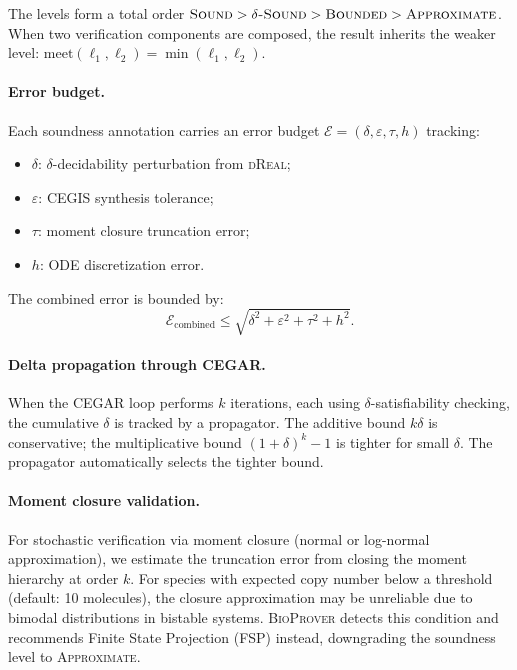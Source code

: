 \documentclass[11pt]{article}
\newcommand{\bioprover}{\textsc{BioProver}}
\newcommand{\cegar}{\textsc{CEGAR}}
\newcommand{\cegis}{\textsc{CEGIS}}
\newcommand{\dreal}{\textsc{dReal}}
\begin{document}
The levels form a total order $\textsc{Sound} > \textsc{$\delta$-Sound}
> \textsc{Bounded} > \textsc{Approximate}$. When two verification
components are composed, the result inherits the weaker level:
$\text{meet}(\ell_1, \ell_2) = \min(\ell_1, \ell_2)$.

\paragraph{Error budget.}
Each soundness annotation carries an error budget $\mathcal{E} =
(\delta, \varepsilon, \tau, h)$ tracking:
\begin{itemize}[itemsep=1pt]
\item $\delta$: $\delta$-decidability perturbation from \dreal{};
\item $\varepsilon$: \cegis{} synthesis tolerance;
\item $\tau$: moment closure truncation error;
\item $h$: ODE discretization error.
\end{itemize}
The combined error is bounded by:
\begin{equation}
  \mathcal{E}_{\text{combined}} \leq
  \sqrt{\delta^2 + \varepsilon^2 + \tau^2 + h^2}.
\end{equation}

\paragraph{Delta propagation through \cegar{}.}
When the \cegar{} loop performs $k$ iterations, each using
$\delta$-satisfiability checking, the cumulative $\delta$ is tracked
by a propagator. The additive bound $k\delta$ is conservative; the
multiplicative bound $(1+\delta)^k - 1$ is tighter for small $\delta$.
The propagator automatically selects the tighter bound.

\paragraph{Moment closure validation.}
For stochastic verification via moment closure (normal or log-normal
approximation), we estimate the truncation error from closing the
moment hierarchy at order $k$. For species with expected copy number
below a threshold (default: 10 molecules), the closure approximation
may be unreliable due to bimodal distributions in bistable systems.
\bioprover{} detects this condition and recommends Finite State
Projection (FSP) instead, downgrading the soundness level to
\textsc{Approximate}.
\end{document}
